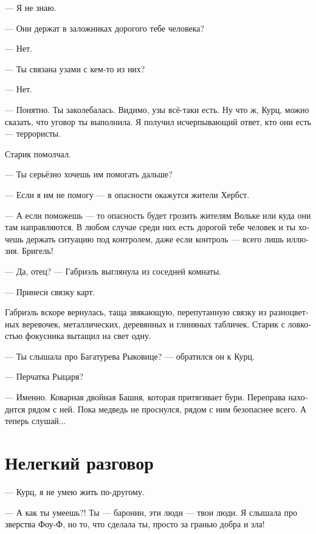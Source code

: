 \documentclass[a4paper,12pt,fleqn]{book}\usepackage{polyglossia}\setdefaultlanguage[babelshorthands=true]{russian}\setotherlanguage{english}\defaultfontfeatures{Ligatures=TeX,Mapping=tex-text}\usepackage{xcolor}\newcommand{\ml}[3]{#2}
\begin{document}
--- Я не знаю.

--- Они держат в заложниках дорогого тебе человека?

--- Нет.

--- Ты связана узами с кем-то из них?

--- Нет.

\ml{$0$}
{--- Понятно.}
{``I see.}
\ml{$0$}
{Ты заколебалась.}
{You hesitated.}
Видимо, узы всё-таки есть.
\ml{$0$}
{Ну что ж, Курц, можно сказать, что уговор ты выполнила.}
{Well, Kurz, I can say you've done your part.}
\ml{$0$}
{Я получил исчерпывающий ответ, кто они есть --- террористы.}
{I received a full answer about who they are: terrorists.''}

Старик помолчал.

--- Ты серьёзно хочешь им помогать дальше?

--- Если я им не помогу --- в опасности окажутся жители Хербст.

--- А если поможешь --- то опасность будет грозить жителям Вольке или куда они там направляются.
В любом случае среди них есть дорогой тебе человек и ты хочешь держать ситуацию под контролем, даже если контроль --- всего лишь иллюзия.
\ml{$0$}
{Бригель!}
{Briegel!''}

--- Да, отец? --- Габриэль выглянула из соседней комнаты.

--- Принеси связку карт.

Габриэль вскоре вернулась, таща звякающую, перепутанную связку из разноцветных веревочек, металлических, деревянных и глиняных табличек.
Старик с ловкостью фокусника вытащил на свет одну.

--- Ты слышала про Багатурева Рыковице? --- обратился он к Курц.

\ml{$0$}
{--- Перчатка Рыцаря?}
{``Knight's Mitten?''}

\ml{$0$}
{--- Именно.}
{``Exactly.}
\ml{$0$}
{Коварная двойная Башня, которая притягивает бури.}
{A treacherous double Tower, which attracts storms.}
Переправа находится рядом с ней.
Пока медведь не проснулся, рядом с ним безопаснее всего.
А теперь слушай...

\section{Нелегкий разговор}

--- Курц, я не умею жить по-другому.

--- А как ты умеешь?!
Ты --- баронин, эти люди --- твои люди.
Я слышала про зверства Фоу-Ф, но то, что сделала ты, просто за гранью добра и зла!
\end{document}
